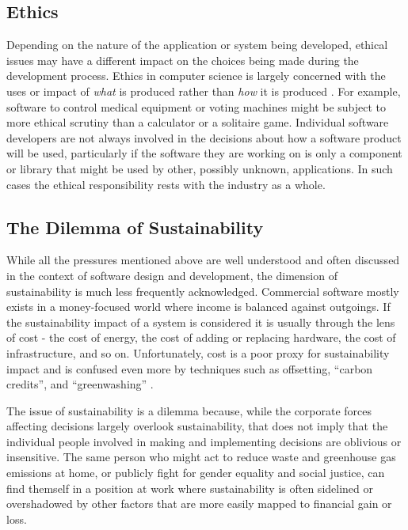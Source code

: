 \subsection{Ethics}

Depending on the nature of the application or system being developed, ethical issues may have a different impact on the choices being made during the development process. Ethics in computer science is largely concerned with the uses or impact of \emph{what} is produced rather than \emph{how} it is produced \citep{Alidoosti2022}. For example, software to control medical equipment or voting machines \citep{Fleischman2010} might be subject to more ethical scrutiny than a calculator or a solitaire game. Individual software developers are not always involved in the decisions about how a software product will be used, particularly if the software they are working on is only a component or library that might be used by other, possibly unknown, applications. In such cases the ethical responsibility rests with the industry as a whole.

\subsection{The Dilemma of Sustainability}

\label{A36}
While all the pressures mentioned above are well understood and often discussed in the context of software design and development, the dimension of sustainability is much less frequently acknowledged. Commercial software mostly exists in a money-focused world where income is balanced against outgoings. If the sustainability impact of a system is considered it is usually through the lens of cost - the cost of energy, the cost of adding or replacing hardware, the cost of infrastructure, and so on. Unfortunately, cost is a poor proxy for sustainability impact \citep{Barbier1990} and is confused even more by techniques such as offsetting, \enquote{carbon credits}, and \enquote{greenwashing} \citep{DeFreitasNetto2020}.

The issue of sustainability is a dilemma because, while the corporate forces affecting decisions largely overlook sustainability, that does not imply that the individual people involved in making and implementing decisions are oblivious or insensitive. The same person who might act to reduce waste and greenhouse gas emissions at home, or publicly fight for gender equality and social justice, can find themself in a position at work where sustainability is often sidelined or overshadowed by other factors that are more easily mapped to financial gain or loss.

